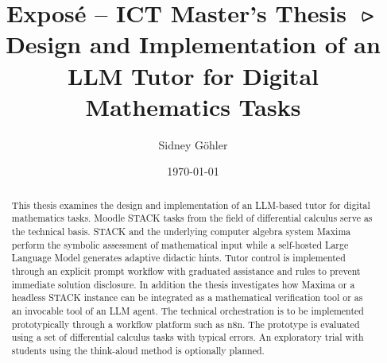 \documentclass[11pt,a4paper,oneside,ngerman]{memoir}
\title{
    \textbf{Exposé -- ICT Master's Thesis}
    \textcolor{htwgreen}{$\rightslice$}
    \newline
    Design and Implementation of an LLM Tutor for Digital Mathematics Tasks
    \newline\newline
}
\author{Sidney Göhler}
\date{\today}
\begin{document}
\maketitle
\vspace*{5em}
\begin{abstract}
This thesis examines the design and implementation of an LLM-based tutor for digital mathematics tasks. Moodle STACK tasks from the field of differential calculus serve as the technical basis. STACK and the underlying computer algebra system Maxima perform the symbolic assessment of mathematical input while a self-hosted Large Language Model generates adaptive didactic hints. Tutor control is implemented through an explicit prompt workflow with graduated assistance and rules to prevent immediate solution disclosure. In addition the thesis investigates how Maxima or a headless STACK instance can be integrated as a mathematical verification tool or as an invocable tool of an LLM agent. The technical orchestration is to be implemented prototypically through a workflow platform such as n8n. The prototype is evaluated using a set of differential calculus tasks with typical errors. An exploratory trial with students using the think-aloud method is optionally planned.
\end{abstract}
\cleardoublepage
\pagestyle{plain}
\tableofcontents
\cleardoublepage
\pagestyle{fancy}
\end{document}
